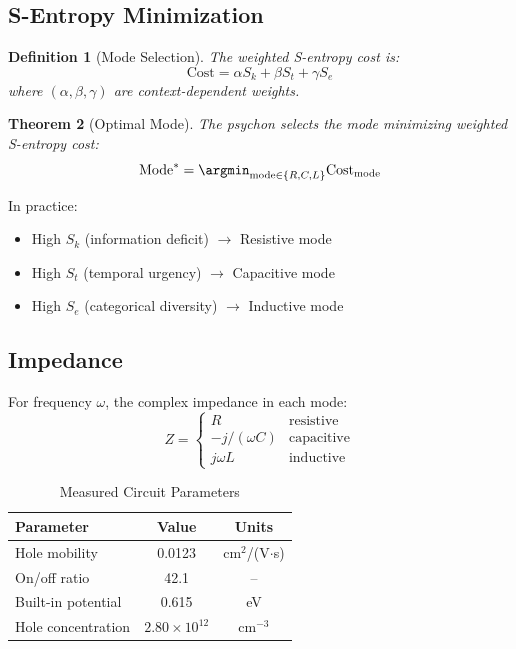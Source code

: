 \documentclass[twocolumn,amsmath,amssymb,aps,prl,superscriptaddress]{revtex4-2}
\newtheorem{theorem}{Theorem}[section]
\newtheorem{definition}[theorem]{Definition}
\newcommand{\Sk}{S_k}
\newcommand{\St}{S_t}
\newcommand{\Se}{S_e}
\begin{document}
\subsection{S-Entropy Minimization}

\begin{definition}[Mode Selection]
The weighted S-entropy cost is:
\begin{equation}
\text{Cost} = \alpha \Sk + \beta \St + \gamma \Se
\end{equation}
where $(\alpha, \beta, \gamma)$ are context-dependent weights.
\end{definition}

\begin{theorem}[Optimal Mode]
The psychon selects the mode minimizing weighted S-entropy cost:
\begin{equation}
\text{Mode}^* = \argmin_{\text{mode} \in \{R, C, L\}} \text{Cost}_{\text{mode}}
\end{equation}
\end{theorem}

In practice:
\begin{itemize}
\item High $\Sk$ (information deficit) $\to$ Resistive mode
\item High $\St$ (temporal urgency) $\to$ Capacitive mode
\item High $\Se$ (categorical diversity) $\to$ Inductive mode
\end{itemize}

\subsection{Impedance}

For frequency $\omega$, the complex impedance in each mode:
\begin{equation}
Z = \begin{cases}
R & \text{resistive} \\
-j/(\omega C) & \text{capacitive} \\
j\omega L & \text{inductive}
\end{cases}
\end{equation}

\begin{table}[h]
\centering
\caption{Measured Circuit Parameters}
\begin{tabular}{lcc}
\toprule
Parameter & Value & Units \\
\midrule
Hole mobility & 0.0123 & cm$^2$/(V$\cdot$s) \\
On/off ratio & 42.1 & -- \\
Built-in potential & 0.615 & eV \\
Hole concentration & $2.80 \times 10^{12}$ & cm$^{-3}$ \\
\bottomrule
\end{tabular}
\end{table}
\end{document}
